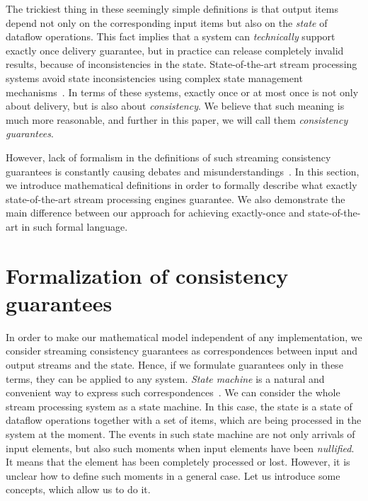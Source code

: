 \documentclass[sigconf]{acmart}
\theoremstyle{remark}
\begin{document}
The trickiest thing in these seemingly simple definitions is that output items depend not only on the corresponding input items but also on the {\em state} of dataflow operations. This fact implies that a system can {\em technically} support exactly once delivery guarantee, but in practice can release completely invalid results, because of inconsistencies in the state. State-of-the-art stream processing systems avoid state inconsistencies using complex state management mechanisms~\cite{Carbone:2017:SMA:3137765.3137777}. In terms of these systems, exactly once or at most once is not only about delivery, but is also about {\em consistency}. We believe that such meaning is much more reasonable, and further in this paper, we will call them {\em consistency guarantees}.   

However, lack of formalism in the definitions of such streaming consistency guarantees is constantly causing debates and misunderstandings~\cite{JerryPengStreamIO, PaperTrail}. In this section, we introduce mathematical definitions in order to formally describe what exactly state-of-the-art stream processing engines guarantee. We also demonstrate the main difference between our approach for achieving exactly-once and state-of-the-art in such formal language.     

\section{Formalization of consistency guarantees}

In order to make our mathematical model independent of any implementation, we consider streaming consistency guarantees as correspondences between input and output streams and the state. Hence, if we formulate guarantees only in these terms, they can be applied to any system. {\em State machine} is a natural and convenient way to express such correspondences~\cite{ссыль}. We can consider the whole stream processing system as a state machine. In this case, the state is a state of dataflow operations together with a set of items, which are being processed in the system at the moment. The events in such state machine are not only arrivals of input elements, but also such moments when input elements have been {\em nullified}. It means that the element has been completely processed or lost. However, it is unclear how to define such moments in a general case. Let us introduce some concepts, which allow us to do it.
\end{document}
